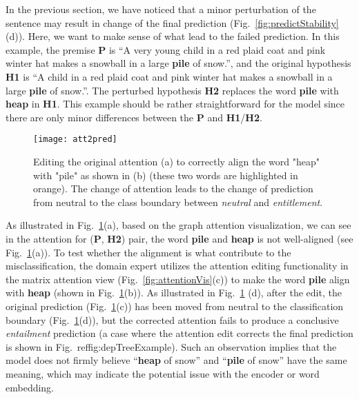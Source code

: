 In the previous section, we have noticed that a minor perturbation of the sentence may result in change of the final prediction (Fig.~\ref{fig:predictStability}(d)). Here, we want to make sense of what lead to the failed prediction. In this example, the premise \textbf{P} is ``A very young child in a red plaid coat and pink winter hat makes a snowball in a large \textbf{pile} of snow.'', and the original hypothesis \textbf{H1} is ``A child in a red plaid coat and pink winter hat makes a snowball in a large \textbf{pile} of snow.''. The perturbed hypothesis \textbf{H2} replaces the word \textbf{pile} with \textbf{heap} in \textbf{H1}. This example should be rather straightforward for the model since there are only minor differences between the \textbf{P} and \textbf{H1}/\textbf{H2}.

\begin{figure}[htbp]
\centering
\vspace{-2mm}
 \texttt{[image: att2pred]}
 \caption{
Editing the original attention (a) to correctly align the word "heap" with "pile" as shown in (b) (these two words are highlighted in orange).
The change of attention leads to the change of prediction from neutral to the class boundary between \emph{neutral} and \emph{entitlement}.
%
}
\label{fig:att2pred}
\end{figure}

As illustrated in Fig.~\ref{fig:att2pred}(a), based on the graph attention visualization, we can see in the attention for (\textbf{P}, \textbf{H2}) pair, the word \textbf{pile} and \textbf{heap} is not well-aligned (see Fig.~\ref{fig:att2pred}(a)).
%
To test whether the alignment is what contribute to the misclassification, the domain expert utilizes the attention editing functionality in the matrix attention view (Fig.~\ref{fig:attentionVis}(c)) to make the word \textbf{pile} align with \textbf{heap} (shown in Fig.~\ref{fig:att2pred}(b)).
%
As illustrated in Fig.~\ref{fig:att2pred} (d), after the edit, the original prediction (Fig.~\ref{fig:att2pred}(c)) has been moved from neutral to the classification boundary (Fig.~\ref{fig:att2pred}(d)), but the corrected attention fails to produce a conclusive \emph{entailment} prediction (a case where the attention edit corrects the final prediction is shown in Fig.~ref{fig:depTreeExample}).
%
Such an observation implies that the model does not firmly believe ``\textbf{heap} of snow'' and ``\textbf{pile} of snow'' have the same meaning, which may indicate the potential issue with the encoder or word embedding.


